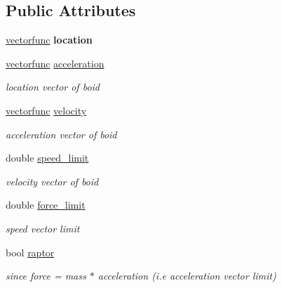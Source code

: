 \subsection*{Public Attributes}
\begin{DoxyCompactItemize}
\item 
\mbox{\label{classboidrules_a0e9029abd27e4e202498f270819f6878}} 
\mbox{\hyperlink{classvectorfunc}{vectorfunc}} {\bfseries location}
\item 
\mbox{\label{classboidrules_a23a05347f2694e15bd07165a60c1407d}} 
\mbox{\hyperlink{classvectorfunc}{vectorfunc}} \mbox{\hyperlink{classboidrules_a23a05347f2694e15bd07165a60c1407d}{acceleration}}
\begin{DoxyCompactList}\small\item\em location vector of boid \end{DoxyCompactList}\item 
\mbox{\label{classboidrules_a32bf5e76cc15e8c16c6a4b25aec532aa}} 
\mbox{\hyperlink{classvectorfunc}{vectorfunc}} \mbox{\hyperlink{classboidrules_a32bf5e76cc15e8c16c6a4b25aec532aa}{velocity}}
\begin{DoxyCompactList}\small\item\em acceleration vector of boid \end{DoxyCompactList}\item 
\mbox{\label{classboidrules_a1fb1fcf0028472dbbfc1fc0201be0f50}} 
double \mbox{\hyperlink{classboidrules_a1fb1fcf0028472dbbfc1fc0201be0f50}{speed\+\_\+limit}}
\begin{DoxyCompactList}\small\item\em velocity vector of boid \end{DoxyCompactList}\item 
\mbox{\label{classboidrules_ae7ec6073d339c52d9cea8fec2bada84a}} 
double \mbox{\hyperlink{classboidrules_ae7ec6073d339c52d9cea8fec2bada84a}{force\+\_\+limit}}
\begin{DoxyCompactList}\small\item\em speed vector limit \end{DoxyCompactList}\item 
\mbox{\label{classboidrules_ac8378b6011030e090f2678a2422d3174}} 
bool \mbox{\hyperlink{classboidrules_ac8378b6011030e090f2678a2422d3174}{raptor}}
\begin{DoxyCompactList}\small\item\em since force = mass $\ast$ acceleration (i.\+e acceleration vector limit) \end{DoxyCompactList}\end{DoxyCompactItemize}


